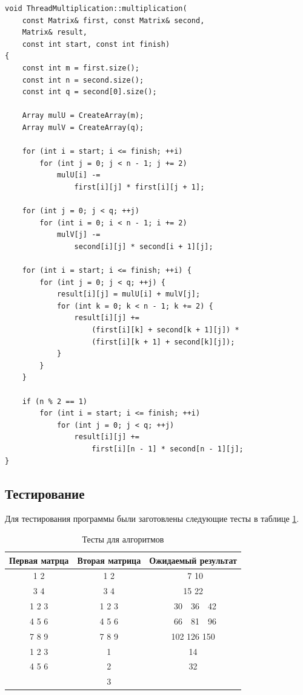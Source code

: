 \documentclass[a4paper,12pt]{article}
\begin{document}
\begin{lstlisting}[caption=Алгоритм Винограда умножения матриц,label=list:vinth]
void ThreadMultiplication::multiplication(
    const Matrix& first, const Matrix& second,
    Matrix& result,
    const int start, const int finish)
{
    const int m = first.size();
    const int n = second.size();
    const int q = second[0].size();

    Array mulU = CreateArray(m);
    Array mulV = CreateArray(q);

    for (int i = start; i <= finish; ++i)
        for (int j = 0; j < n - 1; j += 2)
            mulU[i] -=
                first[i][j] * first[i][j + 1];

    for (int j = 0; j < q; ++j)
        for (int i = 0; i < n - 1; i += 2)
            mulV[j] -=
                second[i][j] * second[i + 1][j];

    for (int i = start; i <= finish; ++i) {
        for (int j = 0; j < q; ++j) {
            result[i][j] = mulU[i] + mulV[j];
            for (int k = 0; k < n - 1; k += 2) {
                result[i][j] +=
                    (first[i][k] + second[k + 1][j]) *
                    (first[i][k + 1] + second[k][j]);
            }
        }
    }

    if (n % 2 == 1)
        for (int i = start; i <= finish; ++i)
            for (int j = 0; j < q; ++j)
                result[i][j] +=
                    first[i][n - 1] * second[n - 1][j];
}
\end{lstlisting}

\subsection{Тестирование}

Для тестирования программы были заготовлены следующие тесты в таблице
\ref{table:test}.

\begin{table}[H]
    \caption{Тесты для алгоритмов}
    \label{table:test}
    \centering
    \begin{tabular}{|c|c|c|}
        \hline
        Первая матрца & Вторая матрица & Ожидаемый результат \\
        \hline
        1 2 & 1 2 & \ 7 10 \\
        3 4 & 3 4 & 15 22 \\
        \hline
        1 2 3 & 1 2 3 & \ 30\ \ 36\ \ 42 \\
        4 5 6 & 4 5 6 & \ 66\ \ 81\ \ 96 \\
        7 8 9 & 7 8 9 & 102 126 150 \\
        \hline
        1 2 3 & 1 & 14 \\
        4 5 6 & 2 & 32 \\
              & 3 & \\
        \hline
    \end{tabular}
\end{table}
\end{document}
